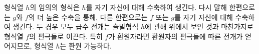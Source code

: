 
형식열 $h$의 임의의 형식은 $h$를 자기 자신에 대해 수축하여 생긴다. 다시 말해 한편으로는 $g$와 $f$의 더 높은 수축을 통해, 다른 한편으로는 $f$ 또는 $g$를 자기 자신에 대해 수축하여 생긴다. 두 경우 모두 급수 전개는 출발형식 $h$에 관해 위에서 보인 것과 마찬가지로 형식열 $f$의 편극들로 이끈다. 특히 $f$가 환원자라면 환원자의 편극들에 따른 전개가 얻어지므로, 형식열 $h$는 환원 가능하다.

